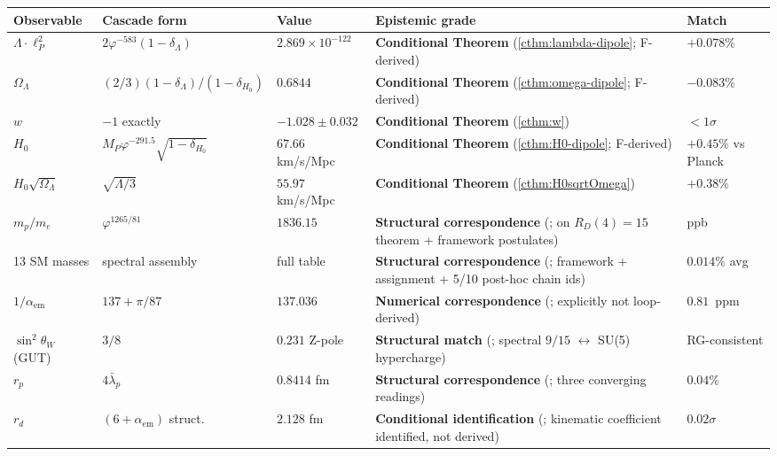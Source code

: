 \documentclass[11pt]{article}
\theoremstyle{plain}
\theoremstyle{definition}
\theoremstyle{remark}
\begin{document}
\begin{center}
\renewcommand{\arraystretch}{1.3}
\footnotesize
\begin{tabular}{p{2.4cm} l p{2.2cm} p{3.2cm} l}
\toprule
\textbf{Observable} & \textbf{Cascade form} & \textbf{Value} & \textbf{Epistemic grade} & \textbf{Match} \\
\midrule
$\Lambda \cdot \ell_P^2$ & $2\varphi^{-583}(1{-}\delta_\Lambda)$ & $2.869 \times 10^{-122}$ & \textbf{Conditional Theorem} (\ref{cthm:lambda-dipole}; F-derived) & $+0.078\%$ \\
$\Omega_\Lambda$ & $(2/3)(1{-}\delta_\Lambda)/(1{-}\delta_{H_0})$ & $0.6844$ & \textbf{Conditional Theorem} (\ref{cthm:omega-dipole}; F-derived) & $-0.083\%$ \\
$w$ & $-1$ exactly & $-1.028 \pm 0.032$ & \textbf{Conditional Theorem} (\ref{cthm:w}) & $< 1\sigma$ \\
$H_0$ & $M_P \varphi^{-291.5}\sqrt{1{-}\delta_{H_0}}$ & $67.66$ km/s/Mpc & \textbf{Conditional Theorem} (\ref{cthm:H0-dipole}; F-derived) & $+0.45\%$ vs Planck \\
$H_0 \sqrt{\Omega_\Lambda}$ & $\sqrt{\Lambda/3}$ & $55.97$ km/s/Mpc & \textbf{Conditional Theorem} (\ref{cthm:H0sqrtOmega}) & $+0.38\%$ \\
$m_p/m_e$ & $\varphi^{1265/81}$ & $1836.15$ & \textbf{Structural correspondence} (\citealp{SmartV}; on $R_D(4){=}15$ theorem + framework postulates) & ppb \\
13 SM masses & spectral assembly & full table & \textbf{Structural correspondence} (\citealp{SmartV}; framework + assignment + 5/10 post-hoc chain ids) & $0.014\%$ avg \\
$1/\alpha_\mathrm{em}$ & $137 + \pi/87$ & $137.036$ & \textbf{Numerical correspondence} (\citealp{SmartXXII}; explicitly not loop-derived) & $0.81$~ppm \\
$\sin^2\theta_W$ (GUT) & $3/8$ & $0.231$ Z-pole & \textbf{Structural match} (\citealp{SmartXXII}; spectral $9/15$ $\leftrightarrow$ SU(5) hypercharge) & RG-consistent \\
$r_p$ & $4 \bar\lambda_p$ & $0.8414$ fm & \textbf{Structural correspondence} (\citealp{SmartXXXII}; three converging readings) & $0.04\%$ \\
$r_d$ & $(6{+}\alpha_\mathrm{em})$ struct. & $2.128$ fm & \textbf{Conditional identification} (\citealp{SmartXXXII}; kinematic coefficient identified, not derived) & $0.02\sigma$ \\
\bottomrule
\end{tabular}
\end{center}
\end{document}
